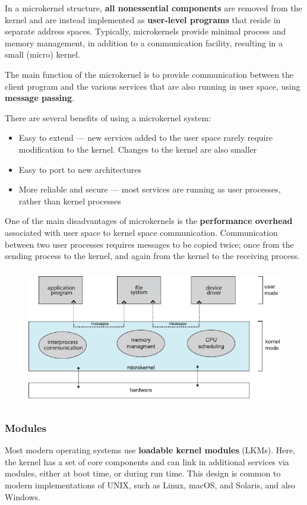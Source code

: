 \documentclass{article}
\begin{document}
In a microkernel structure, \textbf{all nonessential components} are
removed from the kernel and are instead implemented as
\textbf{user-level programs} that reside in separate address spaces.
Typically, microkernels provide minimal process and memory management,
in addition to a communication facility, resulting in a small (micro)
kernel.

The main function of the microkernel is to provide communication
between the client program and the various services that are also
running in user space, using \textbf{message passing}.

There are several benefits of using a microkernel system:
\begin{itemize}
    \item Easy to extend --- new services added to the user space
          rarely require modification to the kernel. Changes to the
          kernel are also smaller
    \item Easy to port to new architectures
    \item More reliable and secure --- most services are running as
          user processes, rather than kernel processes
\end{itemize}
One of the main disadvantages of
microkernels is the \textbf{performance overhead} associated
with user space to kernel space communication.
Communication between two user processes requires messages to be copied
twice; once from the sending process to the kernel, and again from the
kernel to the receiving process.
\begin{figure}[H]
    \centering
    \includegraphics[height = 6cm]{figures/microkernel_structure.pdf}
\end{figure}
\subsubsection{Modules}
Most modern operating systems use \textbf{loadable kernel modules}
(LKMs). Here, the kernel has a set of core components and can link in
additional services via modules, either at boot time, or during run
time. This design is common to modern implementations of UNIX, such as
Linux, macOS, and Solaris, and also Windows.
\end{document}
